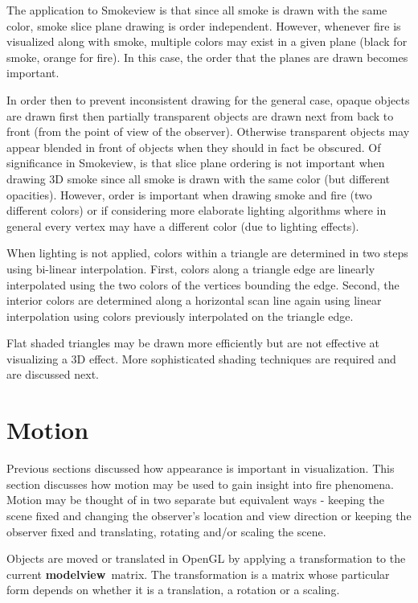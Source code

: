 \documentclass[11pt,twoside]{book}
\begin{document}
The application to Smokeview is that since all smoke is drawn with
the same color, smoke slice plane drawing is order independent.
However, whenever fire is visualized along with smoke, multiple
colors may exist in a given plane (black for smoke, orange for
fire).  In this case, the order that the planes are drawn becomes
important.

In order then to prevent inconsistent drawing for the general
case, opaque objects are drawn first then partially transparent
objects are drawn next from back to front (from the point of view
of the observer). Otherwise transparent objects may appear blended
in front of objects when they should in fact be obscured. Of
significance in Smokeview, is that slice plane ordering is not
important when drawing 3D smoke since all smoke is drawn with the
same color (but different opacities).  However, order is important
when drawing smoke and fire (two different colors) or if
considering more elaborate lighting algorithms where in general
every vertex may have a different color (due to lighting effects).

When lighting is not applied, colors within a triangle are
determined in two steps using bi-linear interpolation. First,
colors along a triangle edge are linearly interpolated using the
two colors of the vertices bounding the edge. Second, the interior
colors are determined along a horizontal scan line again using
linear interpolation using colors previously interpolated on the
triangle edge.

Flat shaded triangles may be drawn more efficiently but are not
effective at visualizing a 3D effect.  More sophisticated shading
techniques are required and are discussed next.

%
%

\section{Motion} Previous sections discussed how appearance is important
in visualization.  This section discusses how motion may be used to gain
insight into fire phenomena.  Motion may be thought of in two separate but
equivalent ways - keeping the scene fixed and changing the observer's location
and view direction or keeping the observer fixed and translating, rotating
and/or scaling the scene.

Objects are moved or translated in OpenGL by applying a transformation to
the current {\bf modelview}\ matrix.  The transformation is a matrix whose
particular form depends on whether it is a translation, a rotation or a scaling.
\end{document}
